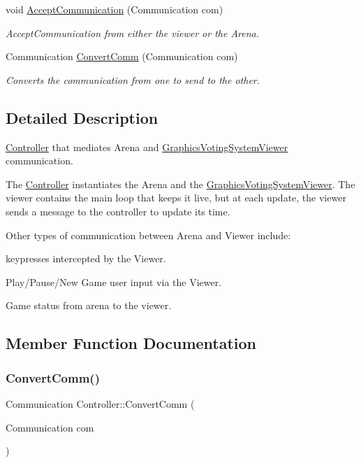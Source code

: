 \begin{DoxyCompactItemize}
void \hyperlink{classController_a55b8d46984535adb91f40309914e8852}{Accept\+Communication} (Communication com)
\begin{DoxyCompactList}\small\item\em Accept\+Communication from either the viewer or the Arena. \end{DoxyCompactList}\item 
Communication \hyperlink{classController_ae9b0504ab74cdacc654528b609074adc}{Convert\+Comm} (Communication com)
\begin{DoxyCompactList}\small\item\em Converts the communication from one to send to the other. \end{DoxyCompactList}\end{DoxyCompactItemize}


\subsection{Detailed Description}
\hyperlink{classController}{Controller} that mediates Arena and \hyperlink{classGraphicsVotingSystemViewer}{Graphics\+Voting\+System\+Viewer} communication. 

The \hyperlink{classController}{Controller} instantiates the Arena and the \hyperlink{classGraphicsVotingSystemViewer}{Graphics\+Voting\+System\+Viewer}. The viewer contains the main loop that keeps it live, but at each update, the viewer sends a message to the controller to update its time.

Other types of communication between Arena and Viewer include\+:
\begin{DoxyItemize}
\item keypresses intercepted by the Viewer.
\item Play/\+Pause/\+New Game user input via the Viewer.
\item Game status from arena to the viewer. 
\end{DoxyItemize}

\subsection{Member Function Documentation}
\mbox{\label{classController_ae9b0504ab74cdacc654528b609074adc}} 
\subsubsection{\texorpdfstring{Convert\+Comm()}{ConvertComm()}}
{\footnotesize\ttfamily Communication Controller\+::\+Convert\+Comm (\begin{DoxyParamCaption}\item[{Communication}]{com }\end{DoxyParamCaption})}




